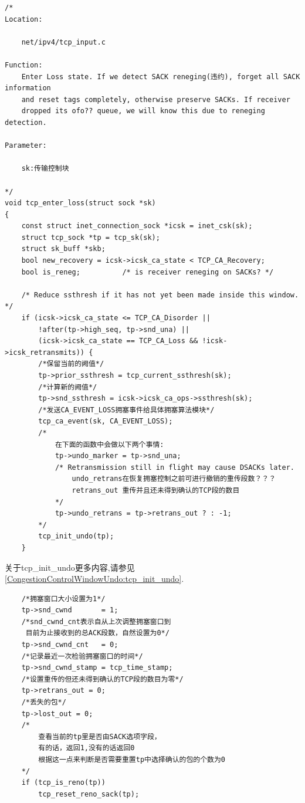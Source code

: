 \begin{verbatim}
/*
Location:

    net/ipv4/tcp_input.c

Function: 
    Enter Loss state. If we detect SACK reneging(违约), forget all SACK information
    and reset tags completely, otherwise preserve SACKs. If receiver
    dropped its ofo?? queue, we will know this due to reneging detection.

Parameter:

    sk:传输控制块

*/
void tcp_enter_loss(struct sock *sk)
{
    const struct inet_connection_sock *icsk = inet_csk(sk);
    struct tcp_sock *tp = tcp_sk(sk);
    struct sk_buff *skb;
    bool new_recovery = icsk->icsk_ca_state < TCP_CA_Recovery;
    bool is_reneg;          /* is receiver reneging on SACKs? */

    /* Reduce ssthresh if it has not yet been made inside this window. */
    if (icsk->icsk_ca_state <= TCP_CA_Disorder ||
        !after(tp->high_seq, tp->snd_una) ||
        (icsk->icsk_ca_state == TCP_CA_Loss && !icsk->icsk_retransmits)) {
        /*保留当前的阙值*/      
        tp->prior_ssthresh = tcp_current_ssthresh(sk);
        /*计算新的阙值*/        
        tp->snd_ssthresh = icsk->icsk_ca_ops->ssthresh(sk);
        /*发送CA_EVENT_LOSS拥塞事件给具体拥塞算法模块*/     
        tcp_ca_event(sk, CA_EVENT_LOSS);
        /*
            在下面的函数中会做以下两个事情:
            tp->undo_marker = tp->snd_una;
            /* Retransmission still in flight may cause DSACKs later. 
                undo_retrans在恢复拥塞控制之前可进行撤销的重传段数？？？
                retrans_out 重传并且还未得到确认的TCP段的数目
            */
            tp->undo_retrans = tp->retrans_out ? : -1;
        */
        tcp_init_undo(tp);
    }
\end{verbatim}

    关于tcp\_init\_undo更多内容,请参见\ref{CongestionControlWindowUndo:tcp_init_undo}.

\begin{verbatim}
    /*拥塞窗口大小设置为1*/
    tp->snd_cwnd       = 1;
    /*snd_cwnd_cnt表示自从上次调整拥塞窗口到
     目前为止接收到的总ACK段数，自然设置为0*/
    tp->snd_cwnd_cnt   = 0;
    /*记录最近一次检验拥塞窗口的时间*/
    tp->snd_cwnd_stamp = tcp_time_stamp;
    /*设置重传的但还未得到确认的TCP段的数目为零*/
    tp->retrans_out = 0;
    /*丢失的包*/
    tp->lost_out = 0;
    /*
        查看当前的tp里是否由SACK选项字段，
        有的话，返回1,没有的话返回0
        根据这一点来判断是否需要重置tp中选择确认的包的个数为0
    */
    if (tcp_is_reno(tp))
        tcp_reset_reno_sack(tp);
\end{verbatim}

